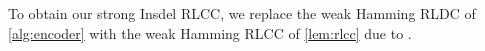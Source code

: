 \documentclass[10pt,a4paper]{article}
\newtheorem{definition}{Definition}
\theoremstyle{remark}
\newcommand{\tuple}[1]{\ensuremath{\left(#1\right)}}
\newcommand{\tp}{\tuple}
\newcommand{\Dec}{\ensuremath{\mathsf{Dec}}\xspace}
\newcommand{\ED}{\ensuremath{\mathsf{ED}}\xspace}%
\begin{document}
To obtain our strong Insdel RLCC, we replace the weak Hamming RLDC of \cref{alg:encoder} with the weak Hamming RLCC of \cref{lem:rlcc} due to \cite{AsadiS21}. 
\end{document}
